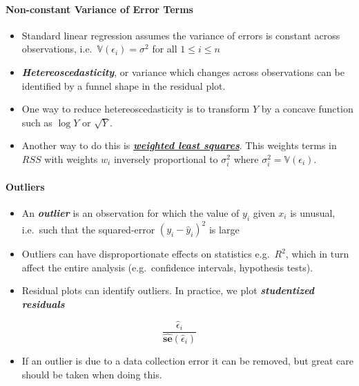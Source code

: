 \documentclass[11pt]{article}
\providecommand{\tightlist}{%
      \setlength{\itemsep}{0pt}\setlength{\parskip}{0pt}}
\begin{document}
    \hypertarget{non-constant-variance-of-error-terms}{%
\paragraph{Non-constant Variance of Error
Terms}\label{non-constant-variance-of-error-terms}}

    \begin{itemize}
\item
  Standard linear regression assumes the variance of errors is constant
  across observations, i.e.~\(\mathbb{V}(\epsilon_i) = \sigma^2\) for
  all \(1 \leqslant i \leqslant n\)
\item
  \textbf{\emph{Hetereoscedasticity}}, or variance which changes across
  observations can be identified by a funnel shape in the residual plot.
\item
  One way to reduce hetereoscedasticity is to transform \(Y\) by a
  concave function such as \(\log Y\) or \(\sqrt{Y}\).
\item
  Another way to do this is
  \href{https://en.wikipedia.org/wiki/Weighted_least_squares}{\textbf{\emph{weighted
  least squares}}}. This weights terms in \(RSS\) with weights \(w_i\)
  inversely proportional to \(\sigma_i^2\) where
  \(\sigma_i^2 = \mathbb{V}(\epsilon_i)\).
\end{itemize}

    \hypertarget{outliers}{%
\paragraph{Outliers}\label{outliers}}

    \begin{itemize}
\item
  An \textbf{\emph{outlier}} is an observation for which the value of
  \(y_i\) given \(x_i\) is unusual, i.e.~such that the squared-error
  \((y_i - \hat{y}_i)^2\) is large
\item
  Outliers can have disproportionate effects on statistics e.g.~\(R^2\),
  which in turn affect the entire analysis (e.g.~confidence intervals,
  hypothesis tests).
\item
  Residual plots can identify outliers. In practice, we plot
  \textbf{\emph{studentized residuals}}
\end{itemize}

\[\frac{\hat{\epsilon}_i}{\hat{\mathbf{se}}(\hat{\epsilon}_i)} \]

\begin{itemize}
\tightlist
\item
  If an outlier is due to a data collection error it can be removed, but
  great care should be taken when doing this.
\end{itemize}
\end{document}
